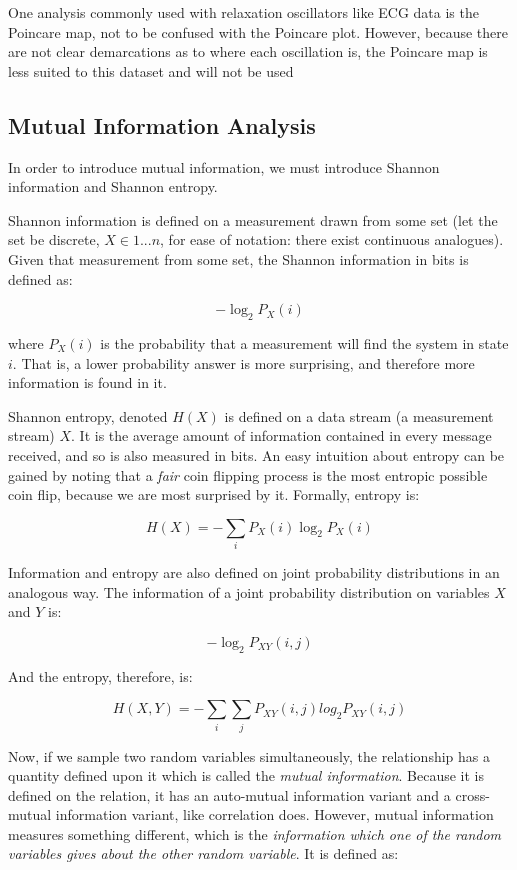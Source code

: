 \documentclass[12pt]{article}
\begin{document}
One analysis commonly used with relaxation oscillators like ECG data is the Poincare map, not to be confused with the Poincare plot. However, because there are not clear demarcations as to where each oscillation is, the Poincare map is less suited to this dataset and will not be used\cite{poincaremap}

\subsection{Mutual Information Analysis}

In order to introduce mutual information, we must introduce Shannon information and Shannon entropy.

Shannon information is defined on a measurement drawn from some set (let the set be discrete, $X \in {1 ... n}$, for ease of notation: there exist continuous analogues). Given that measurement from some set, the Shannon information in bits is defined as:

$$ -\log_2 P_X(i) $$

where $P_X(i)$ is the probability that a measurement will find the system in state $i$. That is, a lower probability answer is more surprising, and therefore more information is found in it.

Shannon entropy, denoted $H(X)$ is defined on a data stream (a measurement stream) $X$. It is the average amount of information contained in every message received, and so is also measured in bits. An easy intuition about entropy can be gained by noting that a \emph{fair} coin flipping process is the most entropic possible coin flip, because we are most surprised by it. Formally, entropy is:

$$H(X) = -\sum_i P_X(i) \log_2 P_X(i)$$

Information and entropy are also defined on joint probability distributions in an analogous way. The information of a joint probability distribution on variables $X$ and $Y$ is:

$$ -\log_2 P_{XY}(i, j) $$

And the entropy, therefore, is:

$$H(X, Y) = -\sum_i \sum_j P_{XY}(i, j) log_2 P_{XY}(i, j)$$

Now, if we sample two random variables simultaneously, the relationship has a quantity defined upon it which is called the \emph{mutual information}. Because it is defined on the relation, it has an auto-mutual information variant and a cross-mutual information variant, like correlation does. However, mutual information measures something different, which is the \emph{information which one of the random variables gives about the other random variable}. It is defined as:
\end{document}
